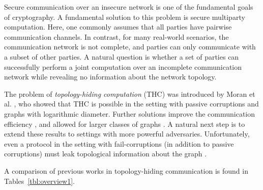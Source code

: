 Secure communication over an insecure network is one of the fundamental goals of cryptography. 
A fundamental solution to this problem is secure multiparty computation. Here, one commonly assumes that all parties have pairwise communication channels.
In contrast, for many real-world scenarios, the communication network is not complete, and parties can only communicate with a subset of other parties. A natural question is whether a set of parties can successfully perform a joint computation over an incomplete communication network while revealing no information about the network topology.

The problem of \emph{topology-hiding computation} (THC) 
was introduced by Moran et al. \cite{TCC:MorOrlRic15}, who showed that 
THC is possible in the setting with passive corruptions and graphs with logarithmic diameter. Further solutions improve the 
communication efficiency \cite{HMTZ16}, and allowed for larger classes of graphs \cite{EC:AkaMor17,ALM17}.
A natural next step is to extend these results to settings with  more powerful adversaries. Unfortunately, even a protocol in the setting with fail-corruptions (in addition to passive corruptions) must leak topological information about the graph \cite{TCC:MorOrlRic15}.

A comparison of previous works in topology-hiding communication is found in Tables~\ref{tbl:overview1}.

